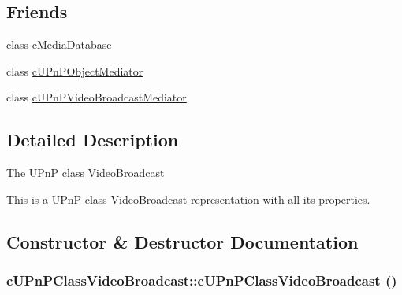 \subsection*{Friends}
\begin{CompactItemize}
\item 
\hypertarget{classcUPnPClassVideoBroadcast_3d0d0aedce8b1c661ea360b9a6d616f6}{
class \hyperlink{classcUPnPClassVideoBroadcast_3d0d0aedce8b1c661ea360b9a6d616f6}{cMediaDatabase}}
\label{classcUPnPClassVideoBroadcast_3d0d0aedce8b1c661ea360b9a6d616f6}

\item 
\hypertarget{classcUPnPClassVideoBroadcast_aefab39434a832c545ac75a79fa81d23}{
class \hyperlink{classcUPnPClassVideoBroadcast_aefab39434a832c545ac75a79fa81d23}{cUPnPObjectMediator}}
\label{classcUPnPClassVideoBroadcast_aefab39434a832c545ac75a79fa81d23}

\item 
\hypertarget{classcUPnPClassVideoBroadcast_23986410a02651ff37a4699efbb7f209}{
class \hyperlink{classcUPnPClassVideoBroadcast_23986410a02651ff37a4699efbb7f209}{cUPnPVideoBroadcastMediator}}
\label{classcUPnPClassVideoBroadcast_23986410a02651ff37a4699efbb7f209}

\end{CompactItemize}


\subsection{Detailed Description}
The UPnP class VideoBroadcast

This is a UPnP class VideoBroadcast representation with all its properties. 

\subsection{Constructor \& Destructor Documentation}
\hypertarget{classcUPnPClassVideoBroadcast_a8d1e73bc9cbb20da6727f3c2e823d79}{
\subsubsection[{cUPnPClassVideoBroadcast}]{\setlength{\rightskip}{0pt plus 5cm}cUPnPClassVideoBroadcast::cUPnPClassVideoBroadcast ()}}
\label{classcUPnPClassVideoBroadcast_a8d1e73bc9cbb20da6727f3c2e823d79}


